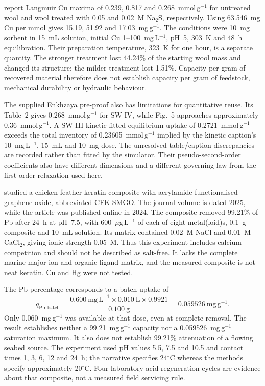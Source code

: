 \citet{enkhzaya2020} report Langmuir Cu maxima of 0.239, 0.817 and 0.268~mmol\,g$^{-1}$ for untreated wool and wool treated with 0.05 and 0.02~M Na$_2$S, respectively. Using 63.546~mg Cu per mmol gives 15.19, 51.92 and 17.03~mg\,g$^{-1}$. The conditions were 10~mg sorbent in 15~mL solution, initial Cu 1--100~mg\,L$^{-1}$, pH~5, 303~K and 48~h equilibration. Their preparation temperature, 323~K for one hour, is a separate quantity. The stronger treatment lost 44.24\% of the starting wool mass and changed its structure; the milder treatment lost 1.51\%. Capacity per gram of recovered material therefore does not establish capacity per gram of feedstock, mechanical durability or hydraulic behaviour.

The supplied Enkhzaya pre-proof also has limitations for quantitative reuse. Its Table~2 gives 0.268~mmol\,g$^{-1}$ for SW-IV, while Fig.~5 approaches approximately 0.36~mmol\,g$^{-1}$. A SW-III kinetic fitted equilibrium uptake of 0.2721~mmol\,g$^{-1}$ exceeds the total inventory of 0.23605~mmol\,g$^{-1}$ implied by the kinetic caption's 10~mg\,L$^{-1}$, 15~mL and 10~mg dose. The unresolved table/caption discrepancies are recorded rather than fitted by the simulator. Their pseudo-second-order coefficients also have different dimensions and a different governing law from the first-order relaxation used here.

\citet{zubair2025} studied a chicken-feather-keratin composite with acrylamide-functionalised graphene oxide, abbreviated CFK-SMGO. The journal volume is dated 2025, while the article was published online in 2024. The composite removed 99.21\% of Pb after 24~h at pH~7.5, with 600~$\mu$g\,L$^{-1}$ of each of eight metal(loid)s, 0.1~g composite and 10~mL solution. Its matrix contained 0.02~M NaCl and 0.01~M CaCl$_2$, giving ionic strength 0.05~M. Thus this experiment includes calcium competition and should not be described as salt-free. It lacks the complete marine major-ion and organic-ligand matrix, and the measured composite is not neat keratin. Cu and Hg were not tested.

The Pb percentage corresponds to a batch uptake of
\begin{equation}
q_{\mathrm{Pb,batch}}=
\frac{0.600\ \mathrm{mg\,L^{-1}}\times0.010\ \mathrm{L}\times0.9921}
{0.100\ \mathrm{g}}
=0.059526\ \mathrm{mg\,g^{-1}}.
\end{equation}
Only 0.060~mg\,g$^{-1}$ was available at that dose, even at complete removal. The result establishes neither a 99.21~mg\,g$^{-1}$ capacity nor a 0.059526~mg\,g$^{-1}$ saturation maximum. It also does not establish 99.21\% attenuation of a flowing seabed source. The experiment used pH values 5.5, 7.5 and 10.5 and contact times 1, 3, 6, 12 and 24~h; the narrative specifies 24$^\circ$C whereas the methods specify approximately 20$^\circ$C. Four laboratory acid-regeneration cycles are evidence about that composite, not a measured field servicing rule.


